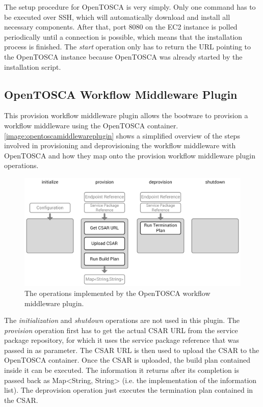 The setup procedure for OpenTOSCA is very simply.
Only one command has to be executed over SSH, which will automatically download and install all necessary components.
After that, port 8080 on the EC2 instance is polled periodically until a connection is possible, which means that the installation process is finished.
The \textit{start} operation only has to return the URL pointing to the OpenTOSCA instance because OpenTOSCA was already started by the installation script.

\subsection{OpenTOSCA Workflow Middleware Plugin}

This provision workflow middleware plugin allows the bootware to provision a workflow middleware using the OpenTOSCA container.
\autoref{image:opentoscamiddlewareplugin} shows a simplified overview of the steps involved in provisioning and deprovisioning the workflow middleware with OpenTOSCA and how they map onto the provision workflow middleware plugin operations.

\begin{figure}[!htbp]
	\centering
	\includegraphics[resolution=600]{implementation/assets/opentosca_middleware_plugin}
	\caption{The operations implemented by the OpenTOSCA workflow middleware plugin.}
	\label{image:opentoscamiddlewareplugin}
\end{figure}

The \textit{initialization} and \textit{shutdown} operations are not used in this plugin.
The \textit{provision} operation first has to get the actual CSAR URL from the service package repository, for which it uses the service package reference that was passed in as parameter.
The CSAR URL is then used to upload the CSAR to the OpenTOSCA container.
Once the CSAR is uploaded, the build plan contained inside it can be executed.
The information it returns after its completion is passed back as Map<String, String> (i.e. the implementation of the information list).
The deprovision operation just executes the termination plan contained in the CSAR.

